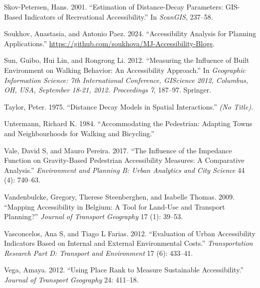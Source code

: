 \documentclass[preprint, 3p,
authoryear]{elsarticle} %
\newlength{\cslhangindent}
\newlength{\cslentryspacingunit} %
\newenvironment{CSLReferences}[2] %
 {%
  \setlength{\parindent}{0pt}
  \ifodd #1
  \let\oldpar\par
  \def\par{\hangindent=\cslhangindent\oldpar}
  \fi
  \setlength{\parskip}{#2\cslentryspacingunit}
 }%
 {}
\begin{document}
\begin{CSLReferences}{1}{0}
\leavevmode{}%
Skov-Petersen, Hans. 2001. {``Estimation of Distance-Decay Parameters:
GIS-Based Indicators of Recreational Accessibility.''} In
\emph{ScanGIS}, 237--58.

\leavevmode{}%
Soukhov, Anastasia, and Antonio Paez. 2024. {``Accessibility Analysis
for Planning Applications.''}
\url{https://github.com/soukhova/MJ-Accessibility-Blogs}.

\leavevmode{}%
Sun, Guibo, Hui Lin, and Rongrong Li. 2012. {``Measuring the Influence
of Built Environment on Walking Behavior: An Accessibility Approach.''}
In \emph{Geographic Information Science: 7th International Conference,
GIScience 2012, Columbus, OH, USA, September 18-21, 2012. Proceedings
7}, 187--97. Springer.

\leavevmode{}%
Taylor, Peter. 1975. {``Distance Decay Models in Spatial
Interactions.''} \emph{(No Title)}.

\leavevmode{}%
Untermann, Richard K. 1984. {``Accommodating the Pedestrian: Adapting
Towns and Neighbourhoods for Walking and Bicycling.''}

\leavevmode{}%
Vale, David S, and Mauro Pereira. 2017. {``The Influence of the
Impedance Function on Gravity-Based Pedestrian Accessibility Measures: A
Comparative Analysis.''} \emph{Environment and Planning B: Urban
Analytics and City Science} 44 (4): 740--63.

\leavevmode{}%
Vandenbulcke, Gregory, Therese Steenberghen, and Isabelle Thomas. 2009.
{``Mapping Accessibility in Belgium: A Tool for Land-Use and Transport
Planning?''} \emph{Journal of Transport Geography} 17 (1): 39--53.

\leavevmode{}%
Vasconcelos, Ana S, and Tiago L Farias. 2012. {``Evaluation of Urban
Accessibility Indicators Based on Internal and External Environmental
Costs.''} \emph{Transportation Research Part D: Transport and
Environment} 17 (6): 433--41.

\leavevmode{}%
Vega, Amaya. 2012. {``Using Place Rank to Measure Sustainable
Accessibility.''} \emph{Journal of Transport Geography} 24: 411--18.


\end{CSLReferences}
\end{document}
